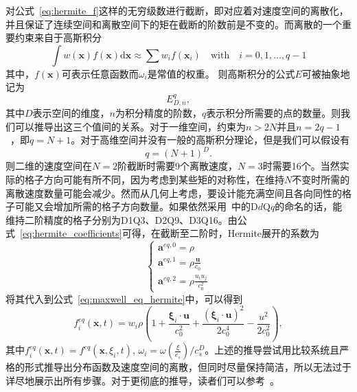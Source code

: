 对公式~\ref{eq:hermite_f}这样的无穷级数进行截断，即对应着对速度空间的离散化，并且保证了连续空间和离散空间下的矩在截断的阶数前是不变的。而离散的一个重要约束来自于高斯积分
\begin{equation}
    \int w(\boldsymbol{x}) f(\boldsymbol{x}) \mathrm{d} \boldsymbol{x} \approx \sum w_i f\left(\boldsymbol{x}_i\right) \quad \text{with} \quad i=0,1, \ldots, q-1
\end{equation}
其中，$f(\boldsymbol{x})$可表示任意函数而$\omega_i$是常值的权重。
则高斯积分的公式$E$可被抽象地记为
\begin{equation}
    E^q_{D,n},
\end{equation}
其中$D$表示空间的维度，$n$为积分精度的阶数，$q$表示积分所需要的点的数量。则我们可以推导出这三个值间的关系。对于一维空间，约束为$n>2N$并且$n=2q-1$~\cite{shan2006kinetic}，即$q=N+1$。对于高维空间并没有一般的高斯积分理论，但是我们可以假设有
\begin{equation}
    q=(N+1)^D.
\end{equation}
则二维的速度空间在$N=2$阶截断时需要9个离散速度，$N=3$时需要16个。当然实际的格子方向可能有所不同，因为考虑到某些矩的对称性，在维持$N$不变时所需的离散速度数量可能会减少。然而从几何上考虑，要设计能充满空间且各向同性的格子可能又会增加所需的格子方向数量。如果依然采用~\cite{qian1992lattice}中的D$d$Q$q$的命名的话，能维持二阶精度的格子分别为D1Q3、D2Q9、D3Q16。由公式~\ref{eq:hermite_coefficients}可得，在截断至二阶时，Hermite展开的系数为
\begin{equation}
    \left\{\begin{array}{l}\boldsymbol{a}^{eq, 0}=\rho \\ \boldsymbol{a}^{eq, 1}=\rho \frac{\boldsymbol{u}}{c_0} \\ \boldsymbol{a}^{eq, 2}=\rho \frac{u_i u_j}{c_0^2}\end{array}\right.
\end{equation}
将其代入到公式~\ref{eq:maxwell_eq_hermite}中，可以得到
\begin{equation}
    f_i^{eq}(\boldsymbol{x}, t)=w_i \rho\left(1+\frac{\boldsymbol{\xi}_i \cdot \boldsymbol{u}}{c_0^2}+\frac{\left(\boldsymbol{\xi}_i \cdot \boldsymbol{u}\right)^2}{2 c_0^4}-\frac{u^2}{2 c_0^2}\right),
    \label{eq:f_eq_o2}
\end{equation}
其中$f_i^{eq}(\boldsymbol{x}, t)=f^{eq}(\boldsymbol{x}, \xi_i, t)$, $\omega_i=\omega(\frac{\xi}{c_s})/c_s^D$。上述的推导尝试用比较系统且严格的形式推导出分布函数及速度空间的离散，但同时尽量保持简洁，所以无法过于详尽地展示出所有步骤。对于更彻底的推导，读者们可以参考~\cite{shan2006kinetic, malaspinas2010lattice}。


